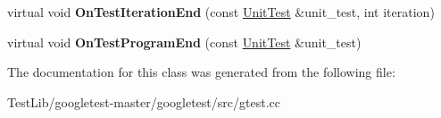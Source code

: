 \begin{DoxyCompactItemize}
\item 
\mbox{\label{classtesting_1_1internal_1_1TestEventRepeater_a94253e3c11753328e8a031f39352708f}} 
virtual void {\bfseries On\+Test\+Iteration\+End} (const \hyperlink{classtesting_1_1UnitTest}{Unit\+Test} \&unit\+\_\+test, int iteration)
\item 
\mbox{\label{classtesting_1_1internal_1_1TestEventRepeater_a4622616259747dbcc23f5ee39ef99ec0}} 
virtual void {\bfseries On\+Test\+Program\+End} (const \hyperlink{classtesting_1_1UnitTest}{Unit\+Test} \&unit\+\_\+test)
\end{DoxyCompactItemize}


The documentation for this class was generated from the following file\+:\begin{DoxyCompactItemize}
\item 
Test\+Lib/googletest-\/master/googletest/src/gtest.\+cc\end{DoxyCompactItemize}
